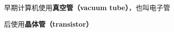 
\begin{issues}
\issueDraft
\end{issues}

早期计算机使用\textbf{真空管（vacuum tube）}，也叫电子管

后使用\textbf{晶体管（transistor）}
